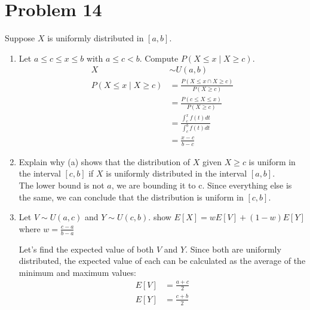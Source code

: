 \documentclass{article}
\begin{document}
\section*{Problem 14}
Suppose \(X\) is uniformly distributed in \([a, b]\).
\begin{enumerate}[label=\alph*)]
    \item Let \(a \leq c \leq x \leq b\) with \(a \leq c < b\). Compute \(P(X \leq x \mid X \geq c)\).
          \begin{align*}
              X                         & \sim U(a, b)                                    \\
              P(X \leq x \mid X \geq c) & = \frac{P(X \leq x \cap X \geq c)}{P(X \geq c)} \\
                                        & = \frac{P(c\leq X \leq x)}{P(X \geq c)}         \\
                                        & = \frac{\int_{c}^{x}f(t)dt}{\int_{c}^{b}f(t)dt} \\
                                        & = \frac{x - c}{b - c}
          \end{align*}
    \item Explain why (a) shows that the distribution of \(X\) given \(X \geq c\) is uniform in the interval \([c, b]\) if \(X\) is uniformly distributed in the interval \([a, b]\).\\
          The lower bound is not \(a\), we are bounding it to c. Since everything else is the same, we can conclude that the distribution is uniform in \([c, b]\).
    \item Let \(V \sim U(a, c)\) and \(Y \sim U(c, b)\). show \(E[X] = wE[V] + (1-w)E[Y]\) where \(w = \frac{c-a}{b-a}\)

          Let's find the expected value of both \(V\) and \(Y\). Since both are uniformly distributed, the expected value of each can be calculated as the average of the minimum and maximum values:
\begin{align*}
E[V] &= \frac{a + c}{2} \\
E[Y] &= \frac{c + b}{2}
\end{align*}


\end{enumerate}
\end{document}
